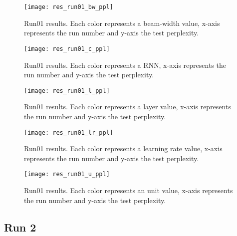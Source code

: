 \begin{landscape}
\begin{figure}
    \centering
    \texttt{[image: res\_run01\_bw\_ppl]}
    \decoRule
    \caption[Results run01 BW-PPL]{Run01 results. Each color represents a beam-width value, x-axis represents the run number and y-axis the test perplexity.}
    \label{fig:res_run01_bw_ppl}
\end{figure}
\begin{figure}
    \centering
    \texttt{[image: res\_run01\_c\_ppl]}
    \decoRule
    \caption[Results run01 C-PPL]{Run01 results. Each color represents a RNN, x-axis represents the run number and y-axis the test perplexity.}
    \label{fig:res_run01_c_ppl}
\end{figure}
\begin{figure}
    \centering
    \texttt{[image: res\_run01\_l\_ppl]}
    \decoRule
    \caption[Results run01 L-PPL]{Run01 results. Each color represents a layer value, x-axis represents the run number and y-axis the test perplexity.}
    \label{fig:res_run01_l_ppl}
\end{figure}
\begin{figure}
    \centering
    \texttt{[image: res\_run01\_lr\_ppl]}
    \decoRule
    \caption[Results run01 LR-PPL]{Run01 results. Each color represents a learning rate value, x-axis represents the run number and y-axis the test perplexity.}
    \label{fig:res_run01_lr_ppl}
\end{figure}
\begin{figure}
    \centering
    \texttt{[image: res\_run01\_u\_ppl]}
    \decoRule
    \caption[Results run01 U-PPL]{Run01 results. Each color represents an unit value, x-axis represents the run number and y-axis the test perplexity.}
    \label{fig:res_run01_u_ppl}
\end{figure}
\end{landscape}

\subsection{Run 2}

